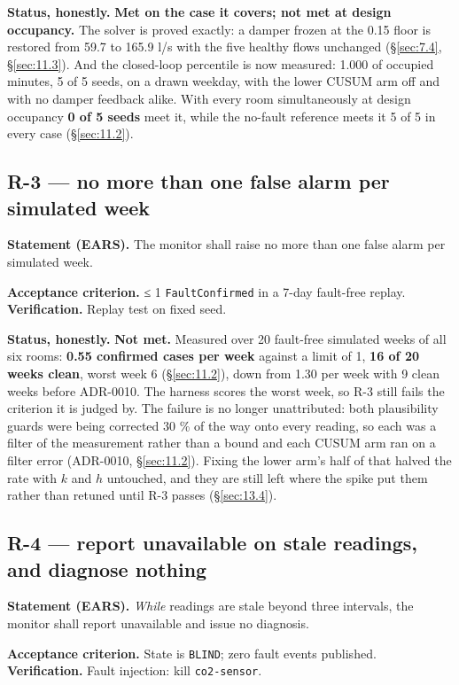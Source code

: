 \textbf{Status, honestly.} \textbf{Met on the case it covers; not met at design occupancy.} The
solver is proved exactly: a damper frozen at the 0.15 floor is restored from 59.7 to 165.9 l/s
with the five healthy flows unchanged (§\ref{sec:7.4}, §\ref{sec:11.3}). And the closed-loop percentile is now
measured: 1.000 of occupied minutes, 5 of 5 seeds, on a drawn weekday, with the lower CUSUM arm off
and with no damper feedback alike. With every room simultaneously at design occupancy \textbf{0 of
5 seeds} meet it, while the no-fault reference meets it 5 of 5 in every case (§\ref{sec:11.2}).

\subsection{R-3 --- no more than one false alarm per simulated week}\label{sec:A.3}

\textbf{Statement (EARS).} The monitor shall raise no more than one false alarm per simulated week.

\textbf{Acceptance criterion.} ≤ 1
\texttt{FaultConfirmed} in a 7-day fault-free replay. \quad \textbf{Verification.} Replay test on fixed seed.

\textbf{Status, honestly.} \textbf{Not met.} Measured over 20 fault-free simulated weeks of all six rooms:
\textbf{0.55 confirmed cases per week} against a limit of 1, \textbf{16 of 20 weeks clean}, worst
week 6 (§\ref{sec:11.2}), down from 1.30 per week with 9 clean weeks before ADR-0010. The harness scores the
worst week, so R-3 still fails the criterion it is judged by. The failure is no longer
unattributed: both plausibility guards were being corrected 30 \% of the way onto every reading, so
each was a filter of the measurement rather than a bound and each CUSUM arm ran on a filter error
(ADR-0010, §\ref{sec:11.2}). Fixing the lower arm's half of that halved the rate with $k$ and $h$ untouched,
and they are still left where the spike put them rather than retuned until R-3 passes (§\ref{sec:13.4}).

\subsection{R-4 --- report unavailable on stale readings, and diagnose nothing}\label{sec:A.4}

\textbf{Statement (EARS).} \emph{While} readings are stale beyond three intervals, the monitor shall report
unavailable and issue no diagnosis.

\textbf{Acceptance criterion.} State is \texttt{BLIND}; zero fault events published. \quad \textbf{Verification.} Fault injection: kill \texttt{co2-sensor}.


